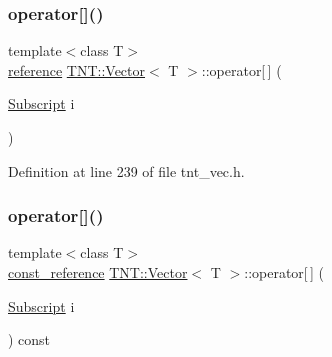 \mbox{\label{classTNT_1_1Vector_ac7fc76b0f4937e37d75f9900fec9c6e1}} 
\subsubsection{\texorpdfstring{operator[]()}{operator[]()}\hspace{0.1cm}{\footnotesize\ttfamily [1/2]}}
{\footnotesize\ttfamily template$<$class T$>$ \\
\hyperlink{classTNT_1_1Vector_a9cdf62749080406bdf3fbace264dac85}{reference} \hyperlink{classTNT_1_1Vector}{T\+N\+T\+::\+Vector}$<$ T $>$\+::operator\mbox{[}$\,$\mbox{]} (\begin{DoxyParamCaption}\item[{\hyperlink{namespaceTNT_af22e3f1460e145c04ce4e7d701e4c1c1}{Subscript}}]{i }\end{DoxyParamCaption})\hspace{0.3cm}{\ttfamily [inline]}}



Definition at line 239 of file tnt\+\_\+vec.\+h.

\mbox{\label{classTNT_1_1Vector_a6aebe1812d10f57221e50850c64f48f1}} 
\subsubsection{\texorpdfstring{operator[]()}{operator[]()}\hspace{0.1cm}{\footnotesize\ttfamily [2/2]}}
{\footnotesize\ttfamily template$<$class T$>$ \\
\hyperlink{classTNT_1_1Vector_a2957faed9560f1f53bc5943a160d71bf}{const\+\_\+reference} \hyperlink{classTNT_1_1Vector}{T\+N\+T\+::\+Vector}$<$ T $>$\+::operator\mbox{[}$\,$\mbox{]} (\begin{DoxyParamCaption}\item[{\hyperlink{namespaceTNT_af22e3f1460e145c04ce4e7d701e4c1c1}{Subscript}}]{i }\end{DoxyParamCaption}) const\hspace{0.3cm}{\ttfamily [inline]}}




